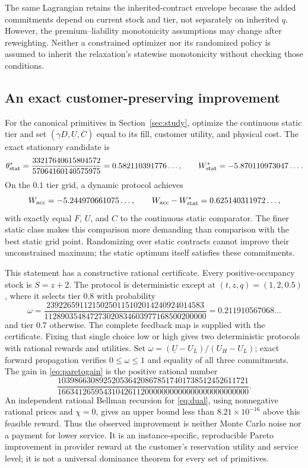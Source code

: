 The same Lagrangian retains the inherited-contract envelope because the added commitments depend on current stock and tier, not separately on inherited $q$. However, the premium--liability monotonicity assumptions may change after reweighting. Neither a constrained optimizer nor its randomized policy is assumed to inherit the relaxation's statewise monotonicity without checking those conditions.

\subsection{An exact customer-preserving improvement}\label{sec:pareto}
For the canonical primitives in Section~\ref{sec:study}, optimize the continuous static tier and set $(\gamma D,\underline U,\overline C)$ equal to its fill, customer utility, and physical cost. The exact stationary candidate is
\[
 \theta^*_{\rm stat}=\frac{33217640615804572}{57064160140575975}
   =0.582110391776\ldots,
 \qquad W^*_{\rm stat}=-5.870110973047\ldots.
\]
On the $0.1$ tier grid, a dynamic protocol achieves
\begin{equation}\label{eq:paretogain}
 W_{\rm acc}=-5.244970661075\ldots,
 \qquad W_{\rm acc}-W^*_{\rm stat}=0.625140311972\ldots,
\end{equation}
with exactly equal $F$, $U$, and $C$ to the continuous static comparator. The finer static class makes this comparison more demanding than comparison with the best static grid point. Randomizing over static contracts cannot improve their unconstrained maximum; the static optimum itself satisfies these commitments.

This statement has a constructive rational certificate. Every positive-occupancy stock is $S=z+2$. The protocol is deterministic except at $(t,z,q)=(1,2,0.5)$, where it selects tier $0.8$ with probability
\[
 \omega=
 \frac{23922659112150250115102014240924014583}
 {112890354847273020834603977168500200000}
 =0.211910567068\ldots
\]
and tier $0.7$ otherwise. The complete feedback map is supplied with the certificate. Fixing that single choice low or high gives two deterministic protocols with rational rewards and utilities. Set $\omega=(\underline U-U_L)/(U_H-U_L)$; exact forward propagation verifies $0\leq\omega\leq1$ and equality of all three commitments. The gain in \eqref{eq:paretogain} is the positive rational number
\[
 \frac{1039866308925205364208678517401738512452611721}
 {1663412659543104261120000000000000000000000000}.
\]
An independent rational Bellman recursion for \eqref{eq:dual}, using nonnegative rational prices and $\chi=0$, gives an upper bound less than $8.21\times10^{-16}$ above this feasible reward. Thus the observed improvement is neither Monte Carlo noise nor a payment for lower service. It is an instance-specific, reproducible Pareto improvement in provider reward at the customer's reservation utility and service level; it is not a universal dominance theorem for every set of primitives.
